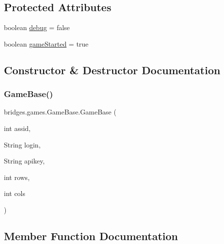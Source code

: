 \subsection*{Protected Attributes}
\begin{DoxyCompactItemize}
\item 
boolean \hyperlink{classbridges_1_1games_1_1_game_base_acfe2d7adaeac12868e8f4541a6458c26}{debug} = false
\item 
boolean \hyperlink{classbridges_1_1games_1_1_game_base_a762327b538bd37afc7ca58e10f15a42c}{game\+Started} = true
\end{DoxyCompactItemize}


\subsection{Constructor \& Destructor Documentation}
\mbox{\label{classbridges_1_1games_1_1_game_base_ad8a4e75eecc34d629c35f37b640f2466}} 
\subsubsection{\texorpdfstring{Game\+Base()}{GameBase()}}
{\footnotesize\ttfamily bridges.\+games.\+Game\+Base.\+Game\+Base (\begin{DoxyParamCaption}\item[{int}]{assid,  }\item[{String}]{login,  }\item[{String}]{apikey,  }\item[{int}]{rows,  }\item[{int}]{cols }\end{DoxyParamCaption})}



\subsection{Member Function Documentation}
\mbox{\label{classbridges_1_1games_1_1_game_base_a03e8446feb00d5957a7e160a4fa76342}} 
